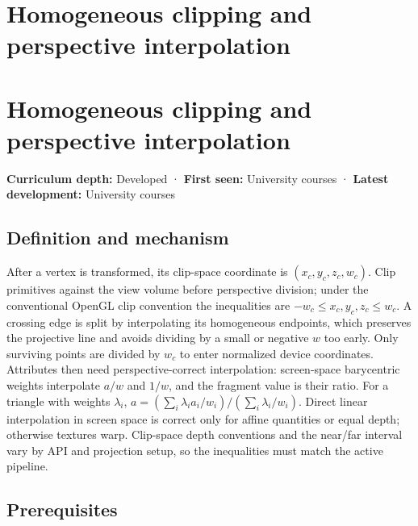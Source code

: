 \hypertarget{appendix-40426e4b2103}{}
\section*{Homogeneous clipping and perspective interpolation}
\section{Homogeneous clipping and perspective interpolation}\label{appendix-40426e4b2103-homogeneous-clipping-and-perspective-interpolation}

\textbf{Curriculum depth:} Developed · \textbf{First seen:} University courses · \textbf{Latest development:} University courses

\subsection{Definition and mechanism}\label{appendix-40426e4b2103-definition-and-mechanism}

After a vertex is transformed, its clip-space coordinate is \((x_c,y_c,z_c,w_c)\). Clip primitives against the view volume before perspective division; under the conventional OpenGL clip convention the inequalities are \(-w_c\le x_c,y_c,z_c\le w_c\). A crossing edge is split by interpolating its homogeneous endpoints, which preserves the projective line and avoids dividing by a small or negative \(w\) too early. Only surviving points are divided by \(w_c\) to enter normalized device coordinates. Attributes then need perspective-correct interpolation: screen-space barycentric weights interpolate \(a/w\) and \(1/w\), and the fragment value is their ratio. For a triangle with weights \(\lambda_i\), \(a=(\sum_i\lambda_i a_i/w_i)/(\sum_i\lambda_i/w_i)\). Direct linear interpolation in screen space is correct only for affine quantities or equal depth; otherwise textures warp. Clip-space depth conventions and the near/far interval vary by API and projection setup, so the inequalities must match the active pipeline.

\subsection{Prerequisites}\label{appendix-40426e4b2103-prerequisites}

